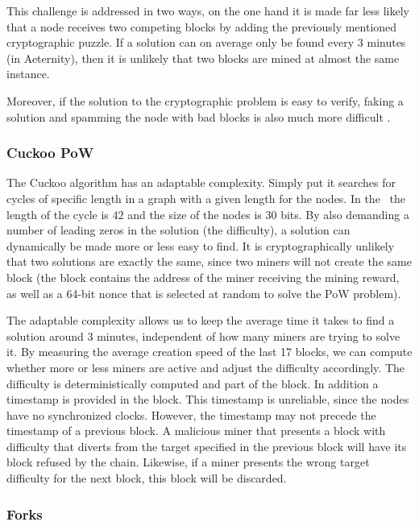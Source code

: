 This challenge is addressed in two ways, on the one hand it is made far
less likely that a node receives two competing blocks by adding the previously
mentioned cryptographic puzzle. If a solution can on average only be found
every 3 minutes (in Aeternity), then it is unlikely that two blocks are
mined at almost the same instance.

Moreover, if the solution to the
cryptographic problem is easy to verify, faking a solution and spamming the
node with bad blocks is also much more difficult
\cite{miningagainstspamming}.

\subsubsection{Cuckoo PoW}

The Cuckoo algorithm has an adaptable complexity. Simply put it
searches for cycles of specific length in a graph with a given length
for the nodes. In the \blockchain\ the length of the cycle is 42 and the size
of the nodes is 30 bits. By also demanding a number of
leading zeros in the solution (the difficulty), a solution can dynamically be made
more or less easy to find. It is cryptographically unlikely that two
solutions are exactly the same, since two miners will not create the
same block (the block contains the address of the miner receiving the
mining reward, as well as a 64-bit nonce that is selected at random to
solve the PoW problem).

The adaptable complexity allows us to keep the average time it takes
to find a solution around 3 minutes, independent of how many miners
are trying to solve it. By measuring the average creation speed of the
last 17 blocks, we can compute whether more or less miners are active and adjust
the difficulty accordingly. The difficulty is deterministically
computed and part of the block. In addition a timestamp is provided in
the block. This timestamp is unreliable, since the nodes have no
synchronized clocks. However, the timestamp may not precede the
timestamp of a previous block. A malicious miner that presents a
block with difficulty that diverts from the target specified in the
previous block will have its block refused by the chain. Likewise, if
a miner presents the wrong target difficulty for the next block, this
block will be discarded.

\subsubsection{Forks}

